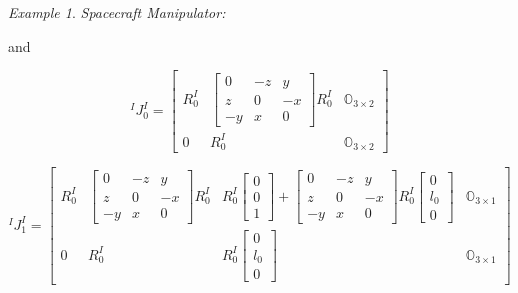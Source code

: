 \documentclass[lettersize,journal]{IEEEtran}
\theoremstyle{remark}
\newtheorem{example}{Example}[subsection]
\begin{document}
\begin{example}{ \textit{Spacecraft Manipulator:}}
\begin{strip}
and

\begin{equation*}
    ^IJ^I_0=\begin{bmatrix}
    R_0^I & \begin{bmatrix}
    0 & -z & y\\z & 0 & -x\\-y & x & 0\end{bmatrix} R_0^ I & \mathbb{O}_{3 \times 2}\\0& R_0^I & \mathbb{O}_{3 \times 2}
    \end{bmatrix}
\end{equation*}

\begin{equation*}
    ^IJ^I_1=\begin{bmatrix}
    R_0^I & \begin{bmatrix}
    0 & -z & y\\z & 0 & -x\\-y & x & 0\end{bmatrix} R_0^ I & R_0^ I \begin{bmatrix} 0 \\ 0 \\ 1\end{bmatrix} +\begin{bmatrix}
    0 & -z & y\\z & 0 & -x\\-y & x & 0\end{bmatrix} R_0^I \begin{bmatrix} 0 \\ l_0 \\ 0\end{bmatrix} & \mathbb{O}_{3 \times 1}\\0& R_0^I & R_0^ I \begin{bmatrix} 0 \\ l_0 \\ 0\end{bmatrix} & \mathbb{O}_{3 \times 1}
    \end{bmatrix}
\end{equation*}


\end{strip}
\end{example}
\end{document}
